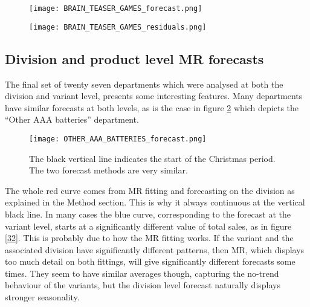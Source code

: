 \documentclass[11pt]{article}
\begin{document}
\begin{figure}[ht]
\centering
\begin{minipage}{.67\textwidth}
  \centering
  \texttt{[image: BRAIN\_TEASER\_GAMES\_forecast.png]}
  \label{23}
\end{minipage}
\begin{minipage}{.67\textwidth}
  \centering
  \texttt{[image: BRAIN\_TEASER\_GAMES\_residuals.png]}
  \label{24}
\end{minipage}
\end{figure}

\subsection{Division and product level MR forecasts}
The final set of twenty seven departments which were analysed at both the division and variant level, presents some interesting features. Many departments have similar forecasts at both levels, as is the case in figure \ref{31} which depicts the ``Other AAA batteries'' department.

\begin{figure}[ht]
\centering
\texttt{[image: OTHER\_AAA\_BATTERIES\_forecast.png]}
\caption{The black vertical line indicates the start of the Christmas period. The two forecast methods are very similar.}
\label{31}
\end{figure}

The whole red curve comes from MR fitting and forecasting on the division as explained in the Method section. This is why it always continuous at the vertical black line. In many cases the blue curve, corresponding to the forecast at the variant level, starts at a significantly different value of total sales, as in figure \ref{32}. This is probably due to how the MR fitting works. If the variant and the associated division have significantly different patterns, then MR, which displays too much detail on both fittings, will give significantly different forecasts some times. They seem to have similar averages though, capturing the no-trend behaviour of the variants, but the division level forecast naturally displays stronger seasonality.\\
\end{document}
